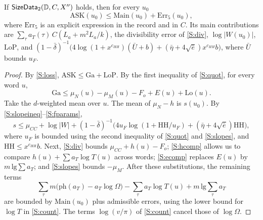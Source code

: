 \begin{proposition}\label{prop:stepanov:pointwise}
If $\mathsf{SizeData}_2(\mathbb D,C,X'')$ holds, then for every $u_0$
\[
\mathrm{ASK}(u_0)\le\mathrm{Main}(u_0)+\mathrm{Err}_5(u_0),
\]
where $\mathrm{Err}_5$ is an explicit expression in the record and in $C$. Its main contributions are
$\sum_\tau a_T(\tau)\,C(L_a+m^2L_a/k)$, the divisibility error of \ref{S:div}, $\log|W(u_0)|$,
$\mathrm{LoP}$, and $(1-\bar\delta)^{-1}\big(4\log(1+x^{c_{HH}})(\bar U+b)+(\bar\eta+4\sqrt{\bar e})x^{c_{HH}}b\big)$,
where $\bar U$ bounds $u_F$.
\end{proposition}

\begin{proof}
By \ref{S:loss}, $\mathrm{ASK}\le\mathrm{Ga}+\mathrm{LoP}$. By the first inequality of \ref{S:quot},
for every word $u$,
\[
\mathrm{Ga}\le\mu_N(u)-\mu_M(u)-F_o+E(u)+\mathrm{Lo}(u).
\]
Take the $d$-weighted mean over $u$. The mean of $\mu_N-h$ is $s(u_0)$. By
\ref{S:slopeineq}--\ref{S:fparams},
\[
s\le\mu_{CC}+\log|W|+(1-\bar\delta)^{-1}\big(4u_F\log(1+\mathrm{HH}/u_F)+(\bar\eta+4\sqrt{\bar e})\mathrm{HH}\big),
\]
where $u_F$ is bounded using the second inequality of \ref{S:quot} and \ref{S:slopes}, and
$\mathrm{HH}\le x^{c_{HH}}b$. Next, \ref{S:div} bounds $\mu_{CC}+h(u)-F_o$; \ref{S:hcomp} allows us to
compare $h(u)+\sum a_T\log T(u)$ across words; \ref{S:ecomp} replaces $E(u)$ by
$m\,\mathrm{lg}\sum a_T$; and \ref{S:slopes} bounds $-\mu_M$. After these substitutions, the
remaining terms
\[
\sum_\tau m\big(\mathrm{ph}(a_T)-a_T\log\Omega\big)-\sum_\tau a_T\log T(u)+m\,\mathrm{lg}\sum_\tau a_T
\]
are bounded by $\mathrm{Main}(u_0)$ plus admissible errors, using the lower bound for $\log T$ in
\ref{S:count}. The terms $\log(v/\pi)$ of \ref{S:count} cancel those of $\log\Omega$.
\end{proof}

